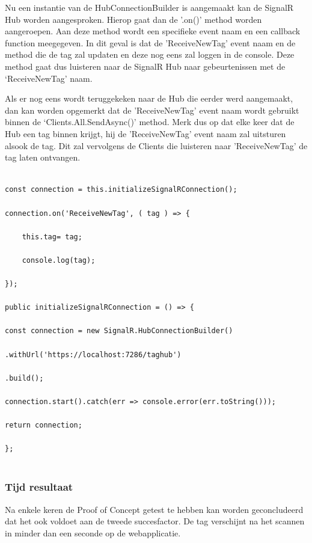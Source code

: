 Nu een instantie van de HubConnectionBuilder is aangemaakt kan de SignalR Hub worden aangesproken. Hierop gaat dan de '.on()' method worden aangeroepen. Aan deze method wordt een specifieke event naam en een callback function meegegeven. In dit geval is dat de 'ReceiveNewTag’ event naam en de method die de tag zal updaten en deze nog eens zal loggen in de console. Deze method gaat dus luisteren naar de SignalR Hub naar gebeurtenissen met de ‘ReceiveNewTag' naam. 

Als er nog eens wordt teruggekeken naar de Hub die eerder werd aangemaakt, dan kan worden opgemerkt dat de 'ReceiveNewTag’ event naam wordt gebruikt binnen de ‘Clients.All.SendAsync()’ method. Merk dus op dat elke keer dat de Hub een tag binnen krijgt, hij de 'ReceiveNewTag’ event naam zal uitsturen alsook de tag. Dit zal vervolgens de Clients die luisteren naar 'ReceiveNewTag’ de tag laten ontvangen.

\begin{verbatim} 
    
const connection = this.initializeSignalRConnection(); 

connection.on('ReceiveNewTag', ( tag ) => { 
    
    this.tag= tag; 
    
    console.log(tag); 
    
}); 

public initializeSignalRConnection = () => { 

const connection = new SignalR.HubConnectionBuilder() 

.withUrl('https://localhost:7286/taghub') 

.build(); 

connection.start().catch(err => console.error(err.toString())); 

return connection; 

}; 
    
\end{verbatim} 

\subsubsection{Tijd resultaat}
Na enkele keren de Proof of Concept getest te hebben kan worden geconcludeerd dat het ook voldoet aan de tweede succesfactor. De tag verschijnt na het scannen in minder dan een seconde op de webapplicatie.



